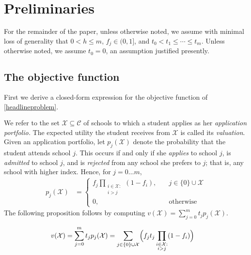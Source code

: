 \section{Preliminaries} \label{sectionModel}

For the remainder of the paper, unless otherwise noted, we assume with minimal loss of generality that $0 < h \leq m$, $f_j \in (0, 1]$, and $t_0 < t_1 \leq \cdots \leq t_m$. Unless otherwise noted, we assume $t_0 = 0$, an assumption justified presently. 

\subsection{The objective function} \label{sectionObjective}

First we derive a closed-form expression for the objective function of \eqref{headlineproblem}.

We refer to the set $\mathcal{X} \subseteq \mathcal{C}$ of schools to which a student applies as her \emph{application portfolio.} The expected utility the student receives from $\mathcal{X}$ is called its \emph{valuation}. Given an application portfolio, let $p_j(\mathcal{X})$ denote the probability that the student attends school $j$. This occurs if and only if she \emph{applies} to school $j$, is \emph{admitted} to school $j$, and is \emph{rejected} from any school she prefers to $j$; that is, any school with higher index. Hence, for $j= 0\dots m$,
\begin{align*}
p_j(\mathcal{X}) &= 
\begin{cases}
\displaystyle f_j  \prod_{\substack{i \in \mathcal{X}: \\ i > j}} (1 - f_{i}), \quad & j \in \{0\}\cup\mathcal{X}\\
0, \quad & \text{otherwise}
\end{cases} 
\end{align*}
The following proposition follows by computing $v(\mathcal{X}) = \sum_{j=0}^m  t_j p_j(\mathcal{X})$.
\begin{proposition}
\begin{align*}
v(\mathcal{X}) &= \sum_{j=0}^m t_j p_j(\mathcal{X}) = \sum_{j\in\{0\}\cup\mathcal{X}} \Bigl( f_j t_j \prod_{\substack{i \in \mathcal{X}: \\ i > j}} (1 - f_{i}) \Bigr)  \label{closedformportfoliovaluationX}%
\end{align*}
\end{proposition}

